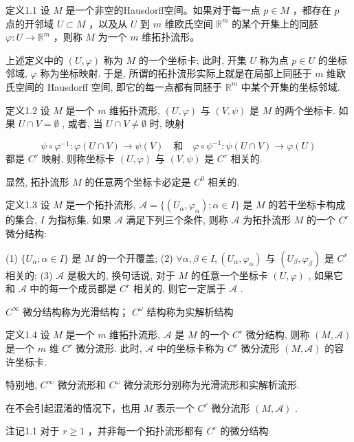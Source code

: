 定义1.1 设  $M$  是一个非空的Hausdorff空间。如果对于每一点  $p \in M$ ，都存在  $p$  点的开邻域  $U \subset M$ ，以及从  $U$  到  $m$  维欧氏空间  $\mathbb{R}^m$  的某个开集上的同胚  $\varphi: U \to \mathbb{R}^m$ ，则称  $M$  为一个  $m$  维拓扑流形。

上述定义中的  $(U, \varphi)$  称为  $M$  的一个坐标卡; 此时, 开集  $U$  称为点  $p \in U$  的坐标邻域,  $\varphi$  称为坐标映射. 于是, 所谓的拓扑流形实际上就是在局部上同胚于  $m$  维欧氏空间的 Hausdorff 空间, 即它的每一点都有同胚于  $\mathbb{R}^m$  中某个开集的坐标邻域.

定义1.2 设  $M$  是一个  $m$  维拓扑流形,  $(U,\varphi)$  与  $(V,\psi)$  是  $M$  的两个坐标卡. 如果  $U\cap V = \emptyset$ , 或者, 当  $U\cap V\neq \emptyset$  时, 映射

$$
\psi \circ \varphi^ {- 1}: \varphi (U \cap V) \to \psi (V) \quad {\text {和}} \quad \varphi \circ \psi^ {- 1}: \psi (U \cap V) \to \varphi (U)
$$
都是  $C^r$  映射, 则称坐标卡  $(U,\varphi)$  与  $(V,\psi)$  是  $C^r$  相关的.

显然, 拓扑流形  $M$  的任意两个坐标卡必定是  $C^0$  相关的.

定义1.3 设  $M$  是一个拓扑流形,  $\mathcal{A} = \{(U_{\alpha}, \varphi_{\alpha}) ; \alpha \in I\}$  是  $M$  的若干坐标卡构成的集合,  $I$  为指标集. 如果  $\mathcal{A}$  满足下列三个条件, 则称  $\mathcal{A}$  为拓扑流形  $M$  的一个  $C^r$  微分结构:

(1)  $\{U_{\alpha}; \alpha \in I\}$  是  $M$  的一个开覆盖;  
(2)  $\forall \alpha, \beta \in I, (U_{\alpha}, \varphi_{\alpha})$  与  $(U_{\beta}, \varphi_{\beta})$  是  $C^r$  相关的;  
(3)  $\mathcal{A}$  是极大的, 换句话说, 对于  $M$  的任意一个坐标卡  $(U, \varphi)$ , 如果它和  $\mathcal{A}$  中的每一个成员都是  $C^r$  相关的, 则它一定属于  $\mathcal{A}$ .

$C^\infty$  微分结构称为光滑结构；  $C^\omega$  结构称为实解析结构

定义1.4 设  $M$  是一个  $m$  维拓扑流形,  $\mathcal{A}$  是  $M$  的一个  $C^r$  微分结构, 则称  $(M, \mathcal{A})$  是一个  $m$  维  $C^r$  微分流形. 此时,  $\mathcal{A}$  中的坐标卡称为  $C^r$  微分流形  $(M, \mathcal{A})$  的容许坐标卡.

特别地,  $C^\infty$  微分流形和  $C^\omega$  微分流形分别称为光滑流形和实解析流形.

在不会引起混淆的情况下，也用  $M$  表示一个  $C^r$  微分流形  $(M, \mathcal{A})$ .

注记1.1 对于  $r \geqslant 1$ ，并非每一个拓扑流形都有  $C^r$  的微分结构

